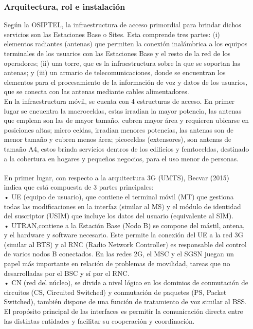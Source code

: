 \documentclass[12pt,a4paper]{article}
\begin{document}
	\subsubsection{Arquitectura, rol e instalación}
	
	Según la OSIPTEL, la infraestructura de acceso primordial para brindar dichos servicios son las Estaciones Base o Sites. Esta comprende tres partes: (i) elementos radiantes (antenas) que permiten la conexión inalámbrica a los equipos terminales de los usuarios con las Estaciones Base y el resto de la red de los operadores; (ii) una torre, que es la infraestructura sobre la que se soportan las antenas; y (iii) un armario de telecomunicaciones, donde se encuentran los elementos para el procesamiento de la información de voz y datos de los usuarios, que se conecta con las antenas mediante cables alimentadores. \\
	
	En la infraestructura móvil, se cuenta con 4 estructuras de acceso. En primer lugar se encuentra la macroceldas, estas irradian la mayor potencia, las antenas que emplean son las de mayor tamaño, cubren mayor área y requieren ubicarse en posiciones altas; micro celdas, irradian menores potencias, las antenas son de menor tamaño y cubren menos área; picoceldas (extensores), son antenas de tamaño A4, estos brinda servicios dentros de los edificios y femtoceldas, destinado a la cobertura en hogares y pequeños negocios, para el uso menor de personas.\\ \\
	
	En primer lugar, con respecto a la arquitectura 3G (UMTS), Becvar (2015) indica que está compuesta de 3 partes principales: \\
	• UE (equipo de usuario), que contiene el terminal móvil (MT) que gestiona todas las modificaciones en la interfaz (similar al MS) y el módulo de identidad del suscriptor (USIM) que incluye los datos del usuario (equivalente al SIM).\\
	• UTRAN,contiene a la Estación Base (Nodo B) se compone del mástil, antena, y el hardware y software necesario. Este permite la conexión del UE a la red 3G (similar al BTS) y al  RNC (Radio Network Controller) es responsable del control de varios nodos B conectados. En las redes 2G, el MSC y el SGSN juegan un papel más importante en relación de problemas de movilidad, tareas que no desarrolladas por el BSC y sí por el RNC. \\ 
	• CN (red del núcleo), se divide a nivel lógico en los dominios de conmutación de circuitos (CS, Circuited Switched) y conmutación de paquetes (PS, Packet Switched), también dispone de una función de tratamiento de voz similar al BSS. El propósito principal de las interfaces es permitir la comunicación directa entre las distintas entidades y facilitar su cooperación y coordinación. 
\end{document}
